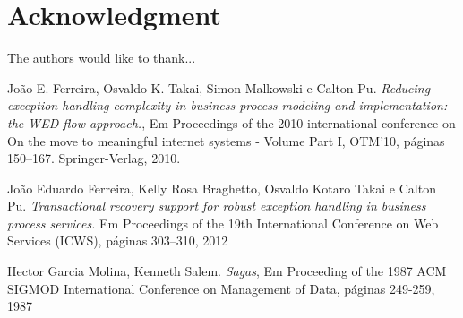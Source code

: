 \documentclass[conference]{IEEEtran}
\begin{document}
\section*{Acknowledgment}


The authors would like to thank...


\ifCLASSOPTIONcaptionsoff
  \newpage
\fi





%
%
%
\begin{thebibliography}{1}

João E. Ferreira, Osvaldo K. Takai, Simon Malkowski e Calton Pu. 
\emph{Reducing exception handling complexity in business process modeling and implementation:
the WED-flow approach.}, Em Proceedings of the 2010 international conference on
On the move to meaningful internet systems - Volume Part I, OTM’10, páginas
150–167. Springer-Verlag, 2010.

João Eduardo Ferreira, Kelly Rosa Braghetto, Osvaldo Kotaro Takai e
Calton Pu.\emph{ Transactional recovery support for robust exception handling in business process
services.} Em Proceedings of the 19th International Conference on Web Services (ICWS), páginas
303–310, 2012

Hector Garcia Molina, Kenneth Salem.
\emph{Sagas}, Em Proceeding of the 1987 ACM SIGMOD International Conference on Management of Data, páginas 249-259, 1987


\end{thebibliography}
\end{document}
